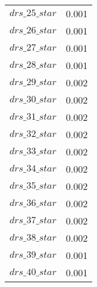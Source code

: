 \begin{center}
\begin{longtable}{cc}
$drs\_25\_star$ 	 & 	 0.001 \\
$drs\_26\_star$ 	 & 	 0.001 \\
$drs\_27\_star$ 	 & 	 0.001 \\
$drs\_28\_star$ 	 & 	 0.001 \\
$drs\_29\_star$ 	 & 	 0.002 \\
$drs\_30\_star$ 	 & 	 0.002 \\
$drs\_31\_star$ 	 & 	 0.002 \\
$drs\_32\_star$ 	 & 	 0.002 \\
$drs\_33\_star$ 	 & 	 0.002 \\
$drs\_34\_star$ 	 & 	 0.002 \\
$drs\_35\_star$ 	 & 	 0.002 \\
$drs\_36\_star$ 	 & 	 0.002 \\
$drs\_37\_star$ 	 & 	 0.002 \\
$drs\_38\_star$ 	 & 	 0.002 \\
$drs\_39\_star$ 	 & 	 0.001 \\
$drs\_40\_star$ 	 & 	 0.001 \\
\bottomrule%
\end{longtable}
\end{center}
